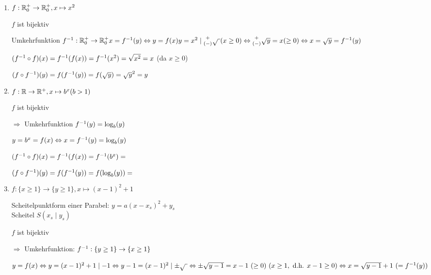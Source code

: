 \clearpage
\Bsps
\begin{enumerate}
	\item $f:\mathbb{R}_0^+\to\mathbb{R}_0^+, x\mapsto x^2$
	
	
	$f$ ist bijektiv
	
	Umkehrfunktion
	$\inv{f}:\Rop\to\Rop\\
	x=\inv{f}(y)\Leftrightarrow y=f(x)\\
	y=x^2 \mid {}^{\white{(}+\white{)}}_{(-)}\sqrt{\ } (x\ge 0)\\
	\Leftrightarrow {}^{\white{(}+\white{)}}_{(-)}\sqrt{y} = x (\ge 0)\\
	\Leftrightarrow x=\sqrt{y} = \inv{f}(y)$
	
	$({f}^{-1}\circ f)(x)={f}^{-1}(f(x))={f}^{-1}(x^2)=\sqrt{x^2} = x$ (da $x\ge 0$)
	
	$(f\circ {f}^{-1})(y)=f({f}^{-1}(y))=f(\sqrt{y})=\sqrt{y}^2 = y$
	
	\clearpage
	\item $f:\mathbb{R}\to\mathbb{R}^+, x\mapsto b^x (b>1)$
	
	
	$f$ ist bijektiv
	
	$\Rightarrow$ Umkehrfunktion ${f}^{-1}(y)= \log_b(y)$
	
	$y=b^x=f(x)\Leftrightarrow x={f}^{-1}(y) = \log_b(y)$
	
	$({f}^{-1}\circ f)(x) = {f}^{-1}(f(x))= {f}^{-1}(b^x) = $ 
	
	$(f\circ {f}^{-1})(y) = f({f}^{-1}(y))= f(\log_b(y)) = $ 
	
	\clearpage
	\item $f:\{x\ge 1\}\to\{y\ge 1\}, x\mapsto (x-1)^2 + 1$
	
	Scheitelpunktform einer Parabel: $y= a(x-x_s)^2+y_s$\\
	Scheitel $S(x_s\mid y_s)$
	
	
	$f$ ist bijektiv
	
	$\Rightarrow$ Umkehrfunktion: ${f}^{-1}:\{y\ge1\}\to\{x\ge 1\}$
	
	$y=f(x) \Leftrightarrow y=(x-1)^2 + 1\mid -1\\
	\Leftrightarrow y - 1=(x-1)^2 \mid \pm\sqrt{\ }\\
	\Leftrightarrow \pm\sqrt{y-1}=x-1\ (\ge 0)\ (x\ge 1,\text{ d.h. }x-1 \ge 0)\\
	\Leftrightarrow x = \sqrt{y-1} +1\ (= {f}^{-1}(y))$
	

\end{enumerate}
